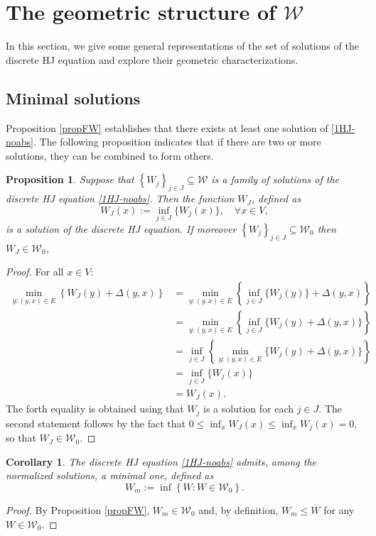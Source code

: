 \documentclass[reqno]{amsart}
\theoremstyle{plain}
\newtheorem{proposition}[theorem]{Proposition}
\newtheorem{corollary}[theorem]{Corollary}
\theoremstyle{definition}
\theoremstyle{remark}
\numberwithin{equation}{section}
\numberwithin{theorem}{section}
\newcommand{\<}{\langle}
\renewcommand{\>}{\rangle}
\begin{document}
\section{The geometric structure of $\mathcal W$}

In this section, we give some general representations of the set of solutions of the discrete HJ equation and explore their geometric characterizations. 

\subsection{Minimal solutions}


Proposition \ref{propFW} establishes that there exists at least one solution of \eqref{1HJ-noabs}. The following proposition indicates that if there are two or more solutions, they can be combined to form others.
\begin{proposition}\label{prop:infsol}
	Suppose that $\left\{W_j\right\}_{j\in J} \subseteq \mathcal W$ is a family of solutions of the discrete HJ equation \eqref{1HJ-noabs}. Then the function $W_J$, defined as 
	\begin{equation*}
		W_{J}(x):=\inf_{j\in J} \{W_j(x)\},\quad \forall x\in V,
	\end{equation*} 
	is a solution of the discrete HJ equation. 
	If moreover $\left\{W_j\right\}_{j\in J} \subseteq \mathcal{W}_0$ then $W_J\in \mathcal{W}_0$,
\end{proposition}
\begin{proof}
	For all $x\in V$:
	\begin{align*}
		\min_{y:(y,x)\in E}\left\{W_J(y)+\Delta(y,x)\right\}&= \min_{y:(y,x)\in E}\left\{\inf_{j\in J}\Big\{W_j(y)\Big\}+\Delta(y,x)\right\} \\
		&= \min_{y:(y,x)\in E}\left\{\inf_{j\in J}\Big\{W_j(y)+\Delta(y,x)\Big\}\right\}\\
		&= \inf_{j\in J}\left\{\min_{y:(y,x)\in E}\Big\{W_j(y)+\Delta(y,x)\Big\}\right\}\\
		&= \inf_{j\in J}\Big\{W_j(x)\Big\}\\
		&= W_J(x).
	\end{align*}
	The forth equality is obtained using that $W_j$ is a solution for each $j\in J$.
	The second statement follows by the fact that $0\leq \inf_x W_J(x)\leq \inf_x W_j(x)=0$, so that $W_J\in \mathcal{W}_0$.
\end{proof}

\begin{corollary}
	The discrete HJ equation \eqref{1HJ-noabs} admits, among the normalized solutions, a minimal one, defined as 
	\begin{equation}
		W_{m}:=\inf \left\{W: W\in \mathcal{W}_0\right\}.
	\end{equation}
\end{corollary}
\begin{proof}
	By Proposition \ref{propFW}, $W_m \in \mathcal{W}_0$ and, by definition, $W_m\leq W$ for any $W\in \mathcal{W}_0$.
\end{proof}
\end{document}
